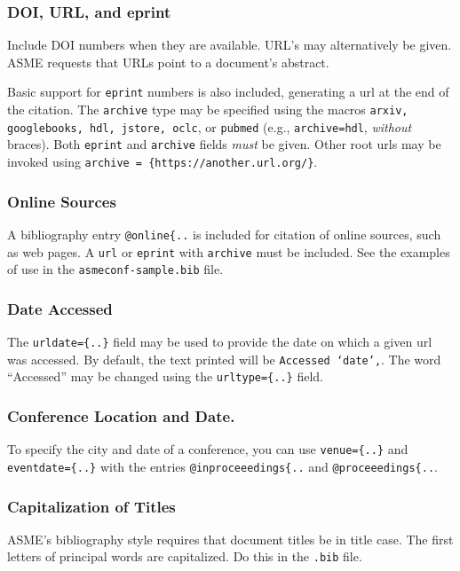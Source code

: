 \documentclass[captionpatch,colorlinks,upint,subscriptcorrection,varvw,mathalfa=cal=boondoxo,german]{asmeconf}
\begin{document}
\subsubsection*{DOI, URL, and eprint} Include DOI numbers when they are available.  URL's may alternatively be given. ASME requests that URLs point to a document's abstract.

Basic support for \texttt{eprint} numbers is also included, generating a url at the end of the citation. The \texttt{archive} type may be specified using the macros \texttt{arxiv, google\-books, hdl, jstore, oclc}, or \texttt{pubmed} (e.g., \texttt{archive=hdl},  \textit{without} braces). Both \texttt{eprint} and \texttt{archive} fields \textit{must} be given. Other root urls may be invoked using \verb|archive = {https://another.url.org/}|.

\subsubsection*{Online Sources} A bibliography entry \verb|@online{..| is included for citation of online sources, such as web pages. A \texttt{url} or \texttt{eprint} with \texttt{archive} must be included. See the examples of use in the \texttt{asmeconf-sample.bib} file. 

\subsubsection*{Date Accessed} The \verb|urldate={..}| field may be used to provide the date on which a given url was accessed. By default, the text printed will be \texttt{Accessed `date',}. The word ``Accessed'' may be changed using the \verb|urltype={..}| field.

\subsubsection*{Conference Location and Date.} To specify the city and date of a conference, you can use \verb|venue={..}| and \verb|eventdate={..}| with the entries \verb|@inproceeedings{..| and \verb|@proceeedings{..|.

\subsubsection*{Capitalization of Titles} ASME's bibliography style requires that document titles be in title case. The first letters of principal words are capitalized. Do this in the \texttt{.bib} file.
\end{document}
